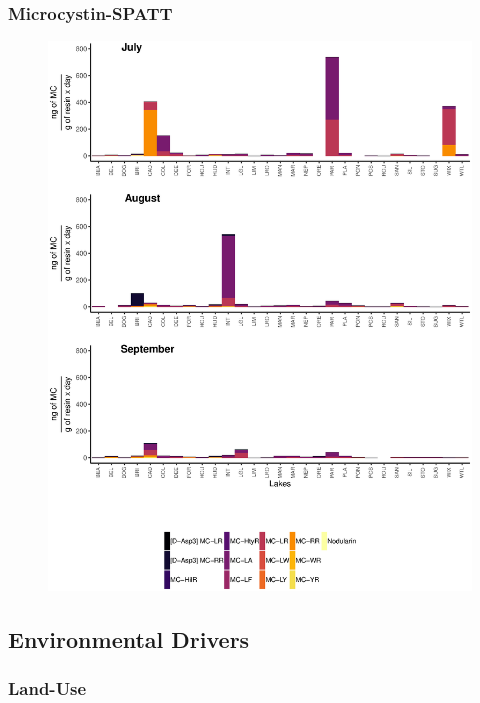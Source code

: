 \begin{frame}
	\frametitle{Microcystin-SPATT}

	\begin{figure}
		\includegraphics[width=\textwidth,height=1.04\textheight]{1spatter.eps}
	\end{figure}

\end{frame}
\subsection{Environmental Drivers}
\begin{frame}
	\frametitle{Land-Use}
		
\end{frame}



